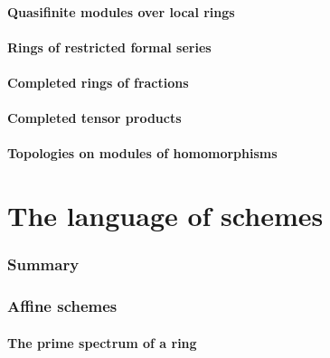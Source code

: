         \subsection{Quasifinite modules over local rings}
        

        \subsection{Rings of restricted formal series}
        

        \subsection{Completed rings of fractions}
        

        \subsection{Completed tensor products}
        

        \subsection{Topologies on modules of homomorphisms}
        

\clearpage

\setcounter{subsection}{0}
\part{The language of schemes}
    
    \section*{Summary}
    

    \section{Affine schemes}
       
        \subsection{The prime spectrum of a ring}
        
       
